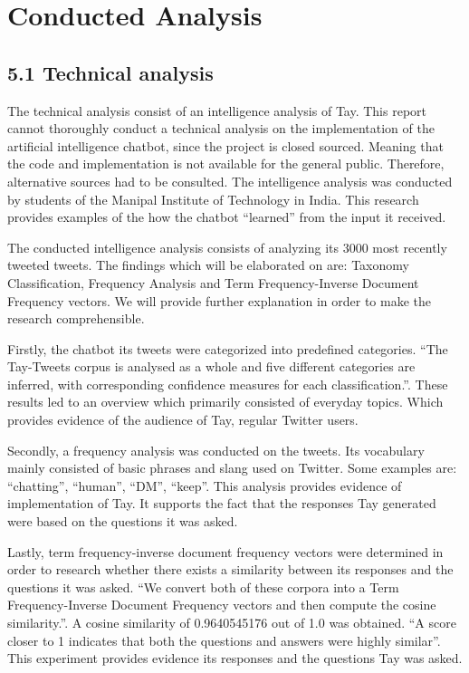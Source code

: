 \chapter{Conducted Analysis}

\section*{\textbf{5.1 Technical analysis}}
The technical analysis consist of an intelligence analysis of Tay. This report cannot thoroughly conduct a technical analysis on the implementation of the artificial intelligence chatbot, since the project is closed sourced. Meaning that the code and implementation is not available for the general public. Therefore, alternative sources had to be consulted. The intelligence analysis was conducted by students of the Manipal Institute of Technology in India. This research provides examples of the how the chatbot “learned” from the input it received.

The conducted intelligence analysis consists of analyzing its 3000 most recently tweeted tweets. The findings which will be elaborated on are: Taxonomy Classification, Frequency Analysis and Term Frequency-Inverse Document Frequency vectors. We will provide further explanation in order to make the research comprehensible.

Firstly, the chatbot its tweets were categorized into predefined categories. “The Tay-Tweets corpus is analysed as a whole and five different categories are inferred, with corresponding confidence measures for each classification.”\cite{IntelligenceAnalysis}. These results led to an overview which primarily consisted of everyday topics. Which provides evidence of the audience of Tay, regular Twitter users.

Secondly, a frequency analysis was conducted on the tweets. Its vocabulary mainly consisted of basic phrases and slang used on Twitter. Some examples are: “chatting”, “human”, “DM”, “keep”\cite{IntelligenceAnalysis}. This analysis provides evidence of implementation of Tay. It supports the fact that the responses Tay generated were based on the questions it was asked.

Lastly, term frequency-inverse document frequency vectors were determined in order to research whether there exists a similarity between its responses and the questions it was asked. “We convert both of these corpora into a Term Frequency-Inverse Document Frequency vectors and then compute the cosine similarity.”\cite{IntelligenceAnalysis}. A cosine similarity of 0.9640545176 out of 1.0 was obtained. “A score closer to 1 indicates that both the questions and answers were highly similar”\cite{IntelligenceAnalysis}. This experiment provides evidence its responses and the questions Tay was asked.

